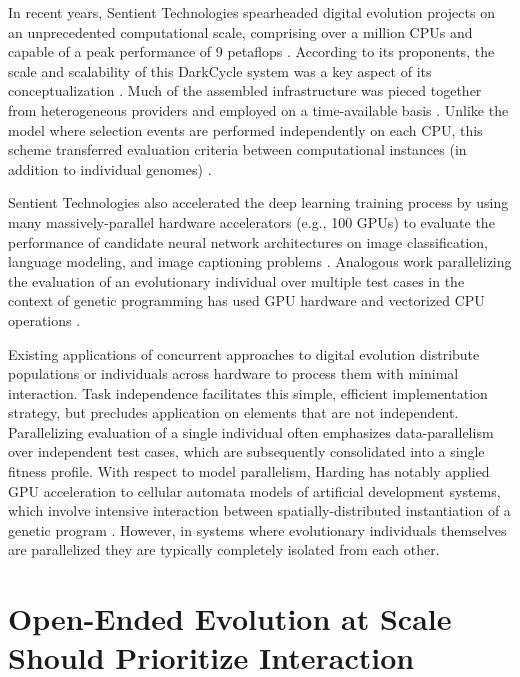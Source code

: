 In recent years, Sentient Technologies spearheaded digital evolution projects on an unprecedented computational scale, comprising over a million CPUs and capable of a peak performance of 9 petaflops \citep{miikkulainen2019evolving}.
According to its proponents, the scale and scalability of this DarkCycle system was a key aspect of its conceptualization \citep{gilbert2015artificial}.
Much of the assembled infrastructure was pieced together from heterogeneous providers and employed on a time-available basis \citep{blondeau2009distributed}.
Unlike the  model where selection events are performed independently on each CPU, this scheme transferred evaluation criteria between computational instances (in addition to individual genomes) \citep{hodjat2013distributed}.

Sentient Technologies also accelerated the deep learning training process by using many massively-parallel hardware accelerators (e.g., 100 GPUs) to evaluate the performance of candidate neural network architectures on image classification, language modeling, and image captioning problems \citep{miikkulainen2019evolving}.
Analogous work parallelizing the evaluation of an evolutionary individual over multiple test cases in the context of genetic programming has used GPU hardware and vectorized CPU operations
\citep{harding2007fast_springer, langdon2019continuous}.

Existing applications of concurrent approaches to digital evolution distribute populations or individuals across hardware to process them with minimal interaction.
Task independence facilitates this simple, efficient implementation strategy, but precludes application on elements that are not independent.
Parallelizing evaluation of a single individual often emphasizes data-parallelism over independent test cases, which are subsequently consolidated into a single fitness profile.
With respect to model parallelism, Harding has notably applied GPU acceleration to cellular automata models of artificial development systems, which involve intensive interaction between spatially-distributed instantiation of a genetic program \citep{harding2007fast_ieee}.
However, in systems where evolutionary individuals themselves are parallelized they are typically completely isolated from each other.

\section{Open-Ended Evolution at Scale Should Prioritize Interaction}

